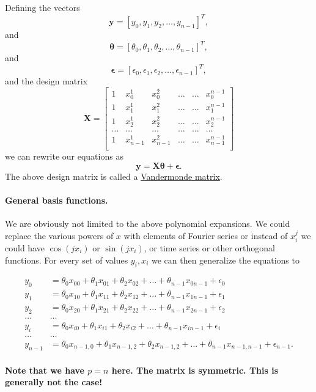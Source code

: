 \documentclass[%
oneside,                 %
final,                   %
10pt]{article}
\newenvironment{block_mdfboxadmon}[1][]{
\begin{block_mdfboxmdframed}[frametitle=#1]
}
{
\end{block_mdfboxmdframed}
}
\begin{document}
\begin{block_mdfboxadmon}[]
Defining the vectors
\[
\bm{y} = [y_0,y_1, y_2,\dots, y_{n-1}]^T,
\]
and
\[
\bm{\theta} = [\theta_0,\theta_1, \theta_2,\dots, \theta_{n-1}]^T,
\]
and
\[
\bm{\epsilon} = [\epsilon_0,\epsilon_1, \epsilon_2,\dots, \epsilon_{n-1}]^T,
\]
and the design matrix
\[
\bm{X}=
\begin{bmatrix} 
1& x_{0}^1 &x_{0}^2& \dots & \dots &x_{0}^{n-1}\\
1& x_{1}^1 &x_{1}^2& \dots & \dots &x_{1}^{n-1}\\
1& x_{2}^1 &x_{2}^2& \dots & \dots &x_{2}^{n-1}\\                      
\dots& \dots &\dots& \dots & \dots &\dots\\
1& x_{n-1}^1 &x_{n-1}^2& \dots & \dots &x_{n-1}^{n-1}\\
\end{bmatrix} 
\]
we can rewrite our equations as
\[
\bm{y} = \bm{X}\bm{\theta}+\bm{\epsilon}.
\]
The above design matrix is called a \href{{https://en.wikipedia.org/wiki/Vandermonde_matrix}}{Vandermonde matrix}.
\end{block_mdfboxadmon} %




\paragraph{General basis functions.}

\begin{block_mdfboxadmon}[]

We are obviously not limited to the above polynomial expansions.  We
could replace the various powers of $x$ with elements of Fourier
series or instead of $x_i^j$ we could have $\cos{(j x_i)}$ or $\sin{(j
x_i)}$, or time series or other orthogonal functions.  For every set
of values $y_i,x_i$ we can then generalize the equations to

\begin{align*}
y_0&=\theta_0x_{00}+\theta_1x_{01}+\theta_2x_{02}+\dots+\theta_{n-1}x_{0n-1}+\epsilon_0\\
y_1&=\theta_0x_{10}+\theta_1x_{11}+\theta_2x_{12}+\dots+\theta_{n-1}x_{1n-1}+\epsilon_1\\
y_2&=\theta_0x_{20}+\theta_1x_{21}+\theta_2x_{22}+\dots+\theta_{n-1}x_{2n-1}+\epsilon_2\\
\dots & \dots \\
y_{i}&=\theta_0x_{i0}+\theta_1x_{i1}+\theta_2x_{i2}+\dots+\theta_{n-1}x_{in-1}+\epsilon_i\\
\dots & \dots \\
y_{n-1}&=\theta_0x_{n-1,0}+\theta_1x_{n-1,2}+\theta_2x_{n-1,2}+\dots+\theta_{n-1}x_{n-1,n-1}+\epsilon_{n-1}.\\
\end{align*}

\textbf{Note that we have $p=n$ here. The matrix is symmetric. This is generally not the case!}
\end{block_mdfboxadmon} %
\end{document}
